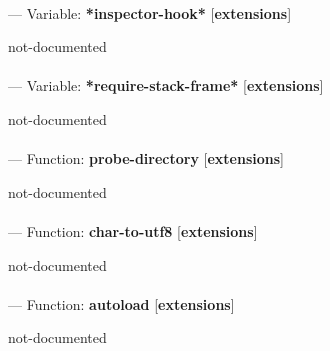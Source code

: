 \paragraph{}
\label{EXTENSIONS:*INSPECTOR-HOOK*}
--- Variable: \textbf{*inspector-hook*} [\textbf{extensions}] \textit{}

\begin{adjustwidth}{5em}{5em}
not-documented
\end{adjustwidth}

\paragraph{}
\label{EXTENSIONS:*REQUIRE-STACK-FRAME*}
--- Variable: \textbf{*require-stack-frame*} [\textbf{extensions}] \textit{}

\begin{adjustwidth}{5em}{5em}
not-documented
\end{adjustwidth}

\paragraph{}
\label{EXTENSIONS:PROBE-DIRECTORY}
--- Function: \textbf{probe-directory} [\textbf{extensions}] \textit{}

\begin{adjustwidth}{5em}{5em}
not-documented
\end{adjustwidth}

\paragraph{}
\label{EXTENSIONS:CHAR-TO-UTF8}
--- Function: \textbf{char-to-utf8} [\textbf{extensions}] \textit{}

\begin{adjustwidth}{5em}{5em}
not-documented
\end{adjustwidth}

\paragraph{}
\label{EXTENSIONS:AUTOLOAD}
--- Function: \textbf{autoload} [\textbf{extensions}] \textit{}

\begin{adjustwidth}{5em}{5em}
not-documented
\end{adjustwidth}

